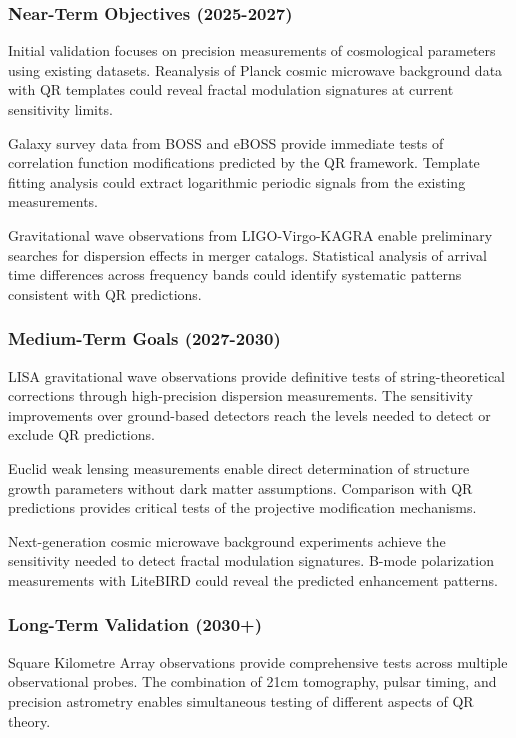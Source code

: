 \subsubsection{Near-Term Objectives (2025-2027)}
\label{subsubsec:near-term}

Initial validation focuses on precision measurements of cosmological parameters using existing datasets. Reanalysis of Planck cosmic microwave background data with QR templates could reveal fractal modulation signatures at current sensitivity limits.

Galaxy survey data from BOSS and eBOSS provide immediate tests of correlation function modifications predicted by the QR framework. Template fitting analysis could extract logarithmic periodic signals from the existing measurements.

Gravitational wave observations from LIGO-Virgo-KAGRA enable preliminary searches for dispersion effects in merger catalogs. Statistical analysis of arrival time differences across frequency bands could identify systematic patterns consistent with QR predictions.

\subsubsection{Medium-Term Goals (2027-2030)}
\label{subsubsec:medium-term}

LISA gravitational wave observations provide definitive tests of string-theoretical corrections through high-precision dispersion measurements. The sensitivity improvements over ground-based detectors reach the levels needed to detect or exclude QR predictions.

Euclid weak lensing measurements enable direct determination of structure growth parameters without dark matter assumptions. Comparison with QR predictions provides critical tests of the projective modification mechanisms.

Next-generation cosmic microwave background experiments achieve the sensitivity needed to detect fractal modulation signatures. B-mode polarization measurements with LiteBIRD could reveal the predicted enhancement patterns.

\subsubsection{Long-Term Validation (2030+)}
\label{subsubsec:long-term}

Square Kilometre Array observations provide comprehensive tests across multiple observational probes. The combination of 21cm tomography, pulsar timing, and precision astrometry enables simultaneous testing of different aspects of QR theory.

